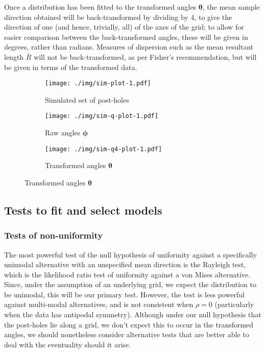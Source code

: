\documentclass[../../ArchStats.tex]{subfiles}
\begin{document}
Once a distribution has been fitted to the transformed angles $\mathbf{\theta}$, the mean sample direction obtained will be back-transformed by dividing by 4, to give the direction of one (and hence, trivially, all) of the axes of the grid; to allow for easier comparison between the back-transformed angles, these will be given in degrees, rather than radians. Measures of dispersion such as the mean resultant length $\bar{R}$ will not be back-transformed, as per Fisher's recommendation, but will be given in terms of the transformed data.

\begin{figure}[h!]
\centering
\caption{Simulated set of buildings with post-holes 1m apart, with Gaussian $N(0,0.1)$ perturbation, and associated angles }
\label{fig:sim1}
\begin{subfigure}[t]{0.38\textwidth}
\caption{Simulated set of post-holes}
\label{fig:sim-plot-1}
\texttt{[image: ./img/sim-plot-1.pdf]}
\end{subfigure}
\begin{subfigure}[t]{0.3\textwidth}
\caption{Raw angles $\mathbf{\phi}$}
\label{fig:sim-q-plot-1}
\texttt{[image: ./img/sim-q-plot-1.pdf]}
\end{subfigure}
\begin{subfigure}[t]{0.3\textwidth}
\caption{Transformed angles $\mathbf{\theta}$}
\label{fig:sim-q4-plot-1}
\texttt{[image: ./img/sim-q4-plot-1.pdf]}
\end{subfigure}
\end{figure}




\subsection{Tests to fit and select models}
\label{sec:model-fitting-tests}

\subsubsection{Tests of non-uniformity}
\label{sec:unif-tests}

The most powerful test of the null hypothesis of uniformity against a specifically unimodal alternative with an unspecified mean direction is the Rayleigh test, which is the likelihood ratio test of uniformity against a von Mises alternative. Since, under the assumption of an underlying grid, we expect the distribution to be unimodal, this will be our primary test. However, the test is less powerful against multi-modal alternatives, and is not consistent when $\rho = 0$ (particularly when the data has antipodal symmetry). Although under our null hypothesis that the post-holes lie along a grid, we don't expect this to occur in the transformed angles, we should nonetheless consider alternative tests that are better able to deal with the eventuality should it arise.
\end{document}
